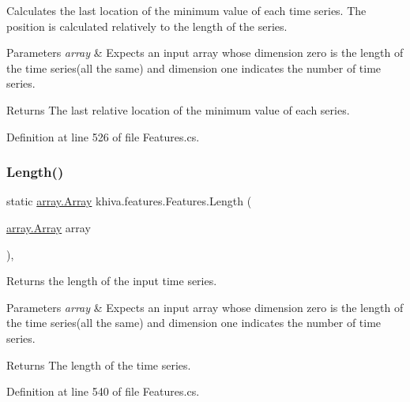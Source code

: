 Calculates the last location of the minimum value of each time series. The position is calculated relatively to the length of the series. 


\begin{DoxyParams}{Parameters}
{\em array} & Expects an input array whose dimension zero is the length of the time series(all the same) and dimension one indicates the number of time series.\\
\hline
\end{DoxyParams}
\begin{DoxyReturn}{Returns}
The last relative location of the minimum value of each series.
\end{DoxyReturn}


Definition at line 526 of file Features.\+cs.

\mbox{\label{classkhiva_1_1features_1_1_features_a20c2e7a25ea7cb185d4093affc417edf}} 
\subsubsection{\texorpdfstring{Length()}{Length()}}
{\footnotesize\ttfamily static \mbox{\hyperlink{classkhiva_1_1array_1_1_array}{array.\+Array}} khiva.\+features.\+Features.\+Length (\begin{DoxyParamCaption}\item[{\mbox{\hyperlink{classkhiva_1_1array_1_1_array}{array.\+Array}}}]{array }\end{DoxyParamCaption})\hspace{0.3cm}{\ttfamily [inline]}, {\ttfamily [static]}}



Returns the length of the input time series. 


\begin{DoxyParams}{Parameters}
{\em array} & Expects an input array whose dimension zero is the length of the time series(all the same) and dimension one indicates the number of time series.\\
\hline
\end{DoxyParams}
\begin{DoxyReturn}{Returns}
The length of the time series.
\end{DoxyReturn}


Definition at line 540 of file Features.\+cs.


